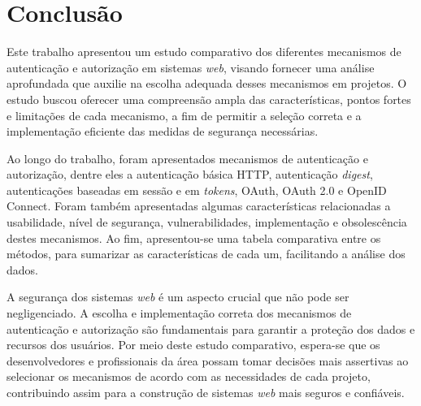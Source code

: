 \section{Conclusão}

Este trabalho apresentou um estudo comparativo dos diferentes mecanismos de 
autenticação e autorização em sistemas \emph{web}, visando fornecer uma análise aprofundada que auxilie na 
escolha adequada desses mecanismos em projetos. O estudo buscou oferecer uma compreensão ampla das 
características, pontos fortes e limitações de cada mecanismo, a fim de permitir a seleção correta 
e a implementação eficiente das medidas de segurança necessárias.

Ao longo do trabalho, foram apresentados mecanismos de autenticação e autorização, dentre eles a
autenticação básica HTTP, autenticação \emph{digest}, autenticações baseadas em sessão e em 
\emph{tokens}, OAuth, OAuth 2.0 e OpenID Connect. Foram também apresentadas algumas 
características relacionadas a usabilidade, nível de segurança, vulnerabilidades, implementação e 
obsolescência destes mecanismos. Ao fim, apresentou-se uma tabela comparativa entre os métodos, para
sumarizar as características de cada um, facilitando a análise dos dados. 

A segurança dos sistemas \emph{web} é um aspecto crucial que não pode ser negligenciado. A escolha e 
implementação correta dos mecanismos de autenticação e autorização são fundamentais para garantir 
a proteção dos dados e recursos dos usuários. Por meio deste estudo comparativo, espera-se que os 
desenvolvedores e profissionais da área possam tomar decisões mais assertivas ao selecionar os 
mecanismos de acordo com as necessidades de cada projeto, contribuindo assim para a 
construção de sistemas \emph{web} mais seguros e confiáveis.